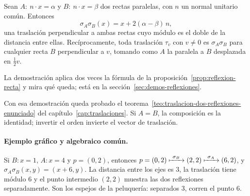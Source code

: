 \begin{teorema}\label{teo:traslacion-dos-reflexiones}
Sean \(A:\ n\cdot x=\alpha\) y \(B:\ n\cdot x=\beta\) dos rectas paralelas, con \(n\) un
normal unitario común. Entonces
\[
  \boxed{\sigma_{A}\sigma_{B}(x)=x+2(\alpha-\beta)\,n},
\]
una traslación perpendicular a ambas rectas cuyo módulo es el doble de la distancia entre
ellas. Recíprocamente, toda traslación \(\tau_v\) con \(v\neq0\) es \(\sigma_{A}\sigma_{B}\) para
cualquier recta \(B\) perpendicular a \(v\), tomando como \(A\) la paralela a \(B\) desplazada
en \(\tfrac12v\).
\end{teorema}

La demostración aplica dos veces la fórmula de la proposición~\ref{prop:reflexion-recta} y mira
qué queda; está en la sección~\ref{sec:demos-reflexiones}.

Con esa demostración queda probado el teorema~\ref{teo:traslacion-dos-reflexiones-enunciado}
del capítulo~\ref{cap:traslaciones}. Si
\(A=B\), la composición es la identidad; invertir el orden invierte el vector de traslación.

\begin{center}
\end{center}

\paragraph{Ejemplo gráfico y algebraico común.}
Si \(B:x=1\), \(A:x=4\) y \(p=(0,2)\), entonces
\(p=(0,2)\xmapsto{\ \sigma_{B}\ }(2,2)\xmapsto{\ \sigma_{A}\ }(6,2)\), y
\(\sigma_{A}\sigma_{B}(x,y)=(x+6,y)\). La distancia entre los ejes es \(3\), la traslación tiene
módulo \(6\) y el punto intermedio \((2,2)\) muestra las dos reflexiones separadamente.
Son los espejos de la peluquería: separados \(3\), corren el punto \(6\).

